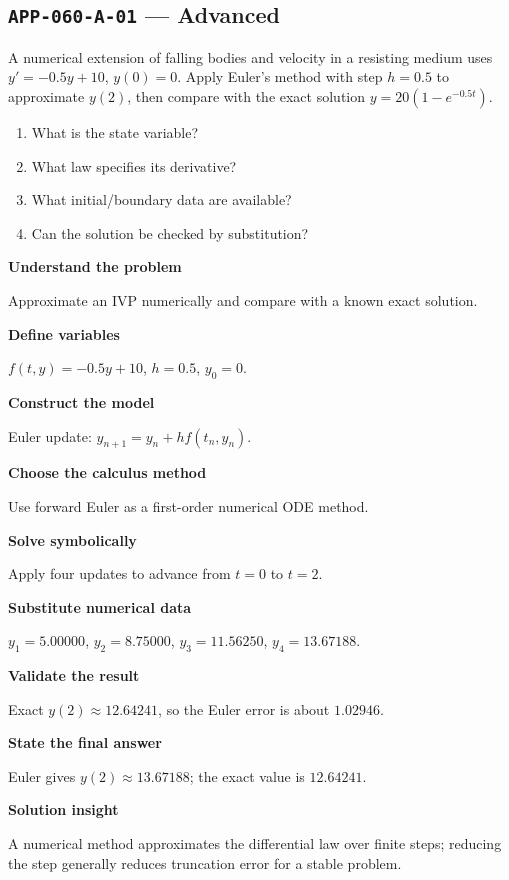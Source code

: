 \documentclass[11pt]{book}
\newcommand{\pid}[1]{\texttt{#1}}
\begin{document}
\subsection*{\pid{APP-060-A-01} — Advanced}
\begin{problembox}
A numerical extension of falling bodies and velocity in a resisting medium uses $y'=-0.5y+10$, $y(0)=0$. Apply Euler's method with step $h=0.5$ to approximate $y(2)$, then compare with the exact solution $y=20(1-e^{-0.5t})$.
\end{problembox}
\begin{promptbox}\begin{enumerate}
\item What is the state variable?
\item What law specifies its derivative?
\item What initial/boundary data are available?
\item Can the solution be checked by substitution?
\end{enumerate}\end{promptbox}
\begin{solutionbox}
\textbf{Understand the problem}\par Approximate an IVP numerically and compare with a known exact solution.\par\medskip
\textbf{Define variables}\par $f(t,y)=-0.5y+10$, $h=0.5$, $y_0=0$.\par\medskip
\textbf{Construct the model}\par Euler update: $y_{n+1}=y_n+h f(t_n,y_n)$.\par\medskip
\textbf{Choose the calculus method}\par Use forward Euler as a first-order numerical ODE method.\par\medskip
\textbf{Solve symbolically}\par Apply four updates to advance from $t=0$ to $t=2$.\par\medskip
\textbf{Substitute numerical data}\par $y_1=5.00000$, $y_2=8.75000$, $y_3=11.56250$, $y_4=13.67188$.\par\medskip
\textbf{Validate the result}\par Exact $y(2)\approx 12.64241$, so the Euler error is about $1.02946$.\par\medskip
\textbf{State the final answer}\par Euler gives $y(2)\approx 13.67188$; the exact value is $12.64241$.\par\medskip
\textbf{Solution insight}\par A numerical method approximates the differential law over finite steps; reducing the step generally reduces truncation error for a stable problem.\par\medskip
\end{solutionbox}
\end{document}
